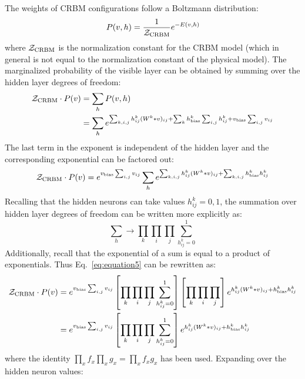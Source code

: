 \documentclass[12pt]{article}
\newcommand{\Eqref}[1]{Eq.~\eqref{#1}}
\begin{document}
The weights of CRBM configurations follow a Boltzmann distribution:
%
\begin{equation}
P(v,h) = \frac{1}{\mathcal{Z}_{\rm{CRBM}}} e^{-E(v,h)}
\end{equation}
%
where $\mathcal{Z}_{\rm{CRBM}}$ is the normalization constant for the CRBM model (which in general is not equal to the normalization constant of the physical model). The marginalized probability of the visible layer can be obtained by summing over the hidden layer degrees of freedom:
%
\begin{align}
\mathcal{Z}_{\rm{CRBM}} \cdot P(v) &= \sum_{h} P(v,h) \nonumber \\ 
&= \sum_{h} e^{\sum_{k,i,j} h_{ij}^k (W^k * v)_{ij} + \sum_{k} h_{\rm{bias}}^k \sum_{i,j} h_{ij}^k + v_{\rm{bias}} \sum_{i,j} v_{ij}} 
\end{align}
%
The last term in the exponent is independent of the hidden layer and the corresponding exponential can be factored out:
%
\begin{equation}
\mathcal{Z}_{\rm{CRBM}} \cdot P(v) = e^{v_{\rm{bias}} \sum_{i,j} v_{ij}} \sum_{h} e^{\sum_{k,i,j} h_{ij}^k (W^k * v)_{ij} + \sum_{k,i,j} h_{\rm{bias}}^k h_{ij}^k}
\label{eq:equation5}
\end{equation}
%
Recalling that the hidden neurons can take values $h_{ij}^k=0,1$, the summation over hidden layer degrees of freedom can be written more explicitly as:
%
\begin{equation}
\sum_h \to \prod_{k} \prod_{i} \prod_{j} \sum_{h_{ij}^k=0}^1
\end{equation}
%
Additionally, recall that the exponential of a sum is equal to a product of exponentials. Thus \Eqref{eq:equation5} can be rewritten as:
%
\begin{align}
\mathcal{Z}_{\rm{CRBM}} \cdot P(v) &= e^{v_{\rm{bias}} \sum_{i,j} v_{ij}} \left [ \prod_{k} \prod_{i} \prod_{j} \sum_{h_{ij}^k=0}^1 \right ] \left [ \prod_{k} \prod_{i} \prod_{j} \right ]e^{h_{ij}^k (W^k * v)_{ij} + h_{\rm{bias}}^k h_{ij}^k} \nonumber \\
&= e^{v_{\rm{bias}} \sum_{i,j} v_{ij}} \left [ \prod_{k} \prod_{i} \prod_{j} \sum_{h_{ij}^k=0}^1 \right ] e^{h_{ij}^k (W^k * v)_{ij} + h_{\rm{bias}}^k h_{ij}^k}
\end{align}
%
where the identity $\prod_x f_x \prod_x g_x = \prod_x f_x g_x$ has been used. Expanding over the hidden neuron values:
%
\end{document}
